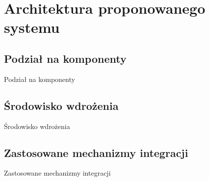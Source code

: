 \chapter{Architektura proponowanego systemu}
\label{cha:architektura}


\section{Podział na komponenty}
\label{sec:komponenty}

Podział na komponenty


\section{Środowisko wdrożenia}
\label{sec:srodowiskoWdrozenia}

Środowisko wdrożenia


\section{Zastosowane mechanizmy integracji}
\label{sec:integracja}

Zastosowane mechanizmy integracji

